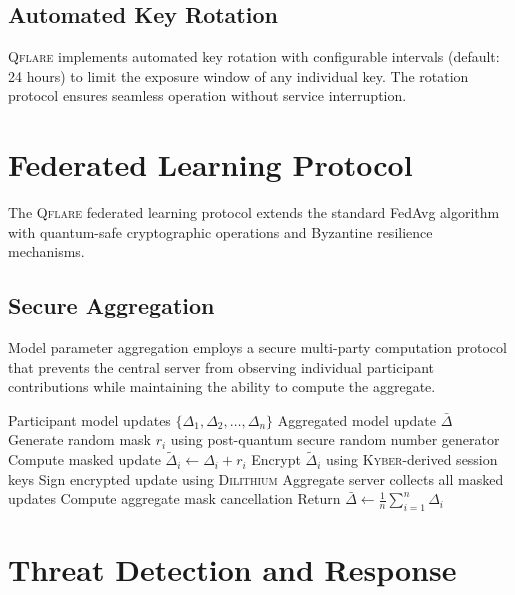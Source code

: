\documentclass[12pt,a4paper,twoside]{book}
\newcommand{\qflare}{\textsc{Qflare}}
\newcommand{\kyber}{\textsc{Kyber}}
\newcommand{\dilithium}{\textsc{Dilithium}}
\begin{document}
\subsection{Automated Key Rotation}
\label{subsec:key-rotation}

\qflare{} implements automated key rotation with configurable intervals (default: 24 hours) to limit the exposure window of any individual key. The rotation protocol ensures seamless operation without service interruption.

\section{Federated Learning Protocol}
\label{sec:fl-protocol}

The \qflare{} federated learning protocol extends the standard FedAvg algorithm with quantum-safe cryptographic operations and Byzantine resilience mechanisms.

\subsection{Secure Aggregation}
\label{subsec:secure-aggregation}

Model parameter aggregation employs a secure multi-party computation protocol that prevents the central server from observing individual participant contributions while maintaining the ability to compute the aggregate.

\begin{algorithm}
\caption{Quantum-Safe Secure Aggregation}
\label{alg:secure-aggregation}
\begin{algorithmic}[1]
\REQUIRE Participant model updates $\{\Delta_1, \Delta_2, \ldots, \Delta_n\}$
\ENSURE Aggregated model update $\bar{\Delta}$
    \STATE Generate random mask $r_i$ using post-quantum secure random number generator
    \STATE Compute masked update $\tilde{\Delta}_i \leftarrow \Delta_i + r_i$
    \STATE Encrypt $\tilde{\Delta}_i$ using \kyber{}-derived session keys
    \STATE Sign encrypted update using \dilithium{}
\ENDFOR
\STATE Aggregate server collects all masked updates
\STATE Compute aggregate mask cancellation
\STATE Return $\bar{\Delta} \leftarrow \frac{1}{n}\sum_{i=1}^n \Delta_i$
\end{algorithmic}
\end{algorithm}

\section{Threat Detection and Response}
\label{sec:threat-detection}
\end{document}
